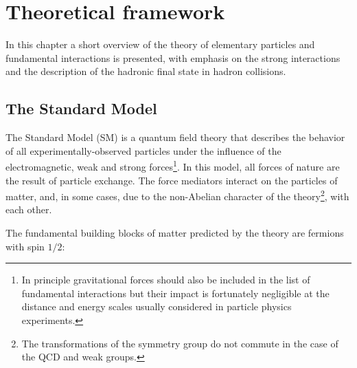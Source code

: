 
%
%
\chapter{Theoretical framework}\label{ch:theory}

In this chapter a short overview of the theory of elementary particles and fundamental interactions is presented, with emphasis on the strong interactions and the description of the hadronic final state in hadron collisions.

\section{The Standard Model}\label{sec:qcdintro}

The Standard Model (SM) is a quantum field theory that describes the behavior of all experimentally-observed particles under the influence of the electromagnetic, weak and strong forces\footnote{In principle gravitational forces should also be included in the list of fundamental interactions but their impact is  fortunately negligible at the distance and energy scales usually considered in particle physics experiments.}. In this model, all forces of nature are the result of particle exchange. The force mediators interact on the particles of matter, and, in some cases, due to the non-Abelian character of the theory\footnote{The transformations of the symmetry group do not commute in the case of the QCD and weak groups.}, with each other.

The fundamental building blocks of matter predicted by the theory are fermions with spin $1/2$:

